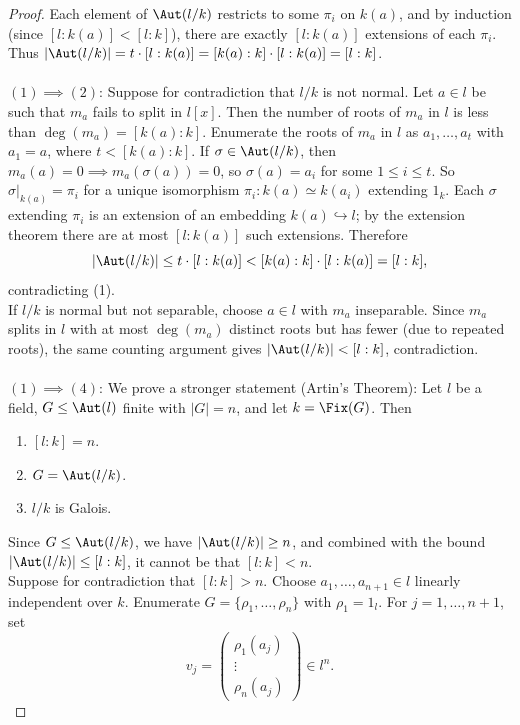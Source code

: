 \documentclass[a4paper,12pt]{article}
\begin{document}
\begin{proof}
    Each element of $\Aut(l/k)$ restricts to some $\pi_i$ on $k(a)$, and by induction (since $[l:k(a)]<[l:k]$), there are exactly $[l:k(a)]$ extensions of each $\pi_i$. Thus $|\Aut(l/k)|=t\cdot[l:k(a)]=[k(a):k]\cdot[l:k(a)]=[l:k]$.\\\\
    $(1)\implies (2)$: Suppose for contradiction that $l/k$ is not normal. Let $a\in l$ be such that $m_a$ fails to split in $l[x]$. Then the number of roots of $m_a$ in $l$ is less than $\deg(m_a)=[k(a):k]$. Enumerate the roots of $m_a$ in $l$ as $a_1,\dots,a_t$ with $a_1=a$, where $t<[k(a):k]$. If $\sigma\in\Aut(l/k)$, then $m_a(a)=0\implies m_a(\sigma(a))=0$, so $\sigma(a)=a_i$ for some $1\leq i\leq t$. So $\sigma|_{k(a)}=\pi_i$ for a unique isomorphism $\pi_i:k(a)\simeq k(a_i)$ extending $1_k$. Each $\sigma$ extending $\pi_i$ is an extension of an embedding $k(a)\hookrightarrow l$; by the extension theorem there are at most $[l:k(a)]$ such extensions. Therefore
    \[
    |\Aut(l/k)|\leq t\cdot [l:k(a)]<[k(a):k]\cdot[l:k(a)]=[l:k],
    \]
    contradicting (1). \\
    If $l/k$ is normal but not separable, choose $a\in l$ with $m_a$ inseparable. Since $m_a$ splits in $l$ with at most $\deg(m_a)$ distinct roots but has fewer (due to repeated roots), the same counting argument gives $|\Aut(l/k)|<[l:k]$, contradiction.\\\\
    $(1)\implies (4)$: We prove a stronger statement (Artin's Theorem): Let $l$ be a field, $G\leq \Aut(l)$ finite with $|G|=n$, and let $k=\Fix(G)$. Then
    \begin{enumerate}[label=(\roman*)]
        \item $[l:k]=n$.
        \item $G=\Aut(l/k)$.
        \item $l/k$ is Galois.
    \end{enumerate}
    Since $G\leq \Aut(l/k)$, we have $|\Aut(l/k)|\geq n$, and combined with the bound $|\Aut(l/k)|\leq [l:k]$, it cannot be that $[l:k]<n$.\\
    Suppose for contradiction that $[l:k]>n$. Choose $a_1,\dots,a_{n+1}\in l$ linearly independent over $k$. Enumerate $G=\{\rho_1,\dots,\rho_n\}$ with $\rho_1=1_l$. For $j=1,\dots,n+1$, set
    \[
    v_j= \begin{pmatrix}
        \rho_1(a_j) \\ 
        \vdots \\ 
        \rho_n(a_j)
    \end{pmatrix}\in l^n.
\]
\end{proof}
\end{document}
